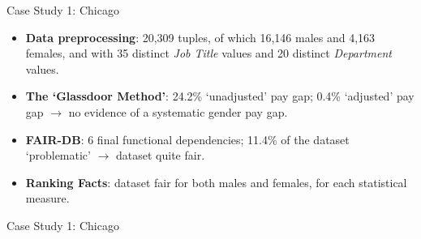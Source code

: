 \documentclass[usenames,dvipsnames]{beamer}
\begin{document}
    
    \begin{frame}{Case Study 1: Chicago}
        \begin{itemize}
            \item \textbf{Data preprocessing}: 20,309 tuples, of which 16,146 males and 4,163 females, and with 35 distinct \textit{Job Title} values and 20 distinct \textit{Department} values.\newline
            \item \textbf{The `Glassdoor Method'}: 24.2\% `unadjusted' pay gap; 0.4\% `adjusted' pay gap $\rightarrow$ no evidence of a systematic gender pay gap.
            \item \textbf{FAIR-DB}: 6 final functional dependencies; 11.4\% of the dataset `problematic' $\rightarrow$ dataset quite fair.
            \item \textbf{Ranking Facts}: dataset fair for both males and females, for each statistical measure.
        \end{itemize}
    \end{frame}
    
    
    \begin{frame}{Case Study 1: Chicago}
        \begin{figure}
            \hfill
        \end{figure}
    \end{frame}
    
\end{document}
